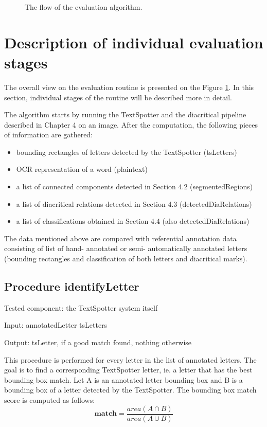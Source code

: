 \documentclass[12pt,a4paper]{report}
\begin{document}
\begin{figure}[htbp]
    \centering
    \caption{The flow of the evaluation algorithm.}
    \label{fig:diacritic-eval-flow}
\end{figure}

\section{Description of individual evaluation stages}
The overall view on the evaluation routine is presented on the Figure \ref{fig:diacritic-eval-flow}. In this section, individual stages of the routine will be described more in detail.

The algorithm starts by running the TextSpotter and the diacritical pipeline described in Chapter 4 on an image. After the computation, the following pieces of information are gathered:
\begin{itemize}
    \item bounding rectangles of letters detected by the TextSpotter (tsLetters)
    \item OCR representation of a word (plaintext)
    \item a list of connected components detected in Section 4.2 (segmentedRegions)
    \item a list of diacritical relations detected in Section 4.3 (detectedDiaRelations)
    \item a list of classifications obtained in Section 4.4 (also detectedDiaRelations)
\end{itemize}

The data mentioned above are compared with referential annotation data consisting of list of hand- annotated or semi- automatically annotated letters (bounding rectangles and classification of both letters and diacritical marks).

\subsection{Procedure identifyLetter}
Tested component: the TextSpotter system itself

Input: annotatedLetter tsLetters

Output: tsLetter, if a good match found, nothing otherwise

This procedure is performed for every letter in the list of annotated letters. The goal is to find a corresponding TextSpotter letter, ie. a letter that has the best bounding box match. Let A is an annotated letter bounding box and B is a bounding box of a letter detected by the TextSpotter. The bounding box match score is computed as follows:
\[
\mathbf{match} = \frac{area(A\cap B)}{area(A\cup B)}
\]
\end{document}
